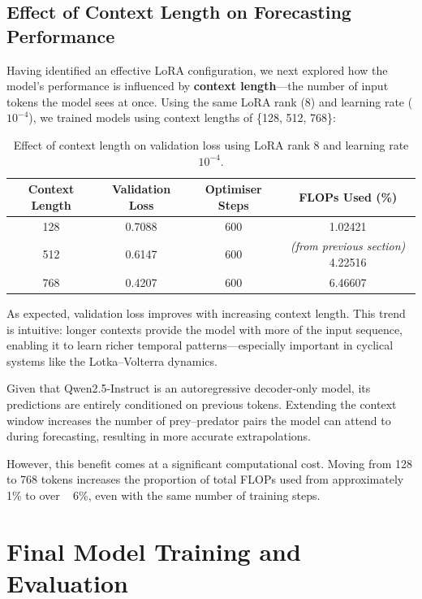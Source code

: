 \documentclass[a4paper,12pt]{article}
\begin{document}
\subsection*{Effect of Context Length on Forecasting Performance}

Having identified an effective LoRA configuration, we next explored how the model’s performance is influenced by \textbf{context length}—the number of input tokens the model sees at once. Using the same LoRA rank (8) and learning rate ($10^{-4}$), we trained models using context lengths of \{128, 512, 768\}:

\begin{table}[H]
  \centering
  \begin{tabular}{|c|c|c|c|}
    \hline
    \textbf{Context Length} & \textbf{Validation Loss} & \textbf{Optimiser Steps} & \textbf{FLOPs Used (\%)} \\
    \hline
    128 & 0.7088 & 600 & 1.02421 \\
    512 & 0.6147 & 600 & \textit{(from previous section)} 4.22516 \\
    768 & 0.4207 & 600 & 6.46607 \\
    \hline
  \end{tabular}
  \vspace{0.2cm}
  \caption{Effect of context length on validation loss using LoRA rank 8 and learning rate $10^{-4}$.}
  \label{tab:context_length_results}
\end{table}

As expected, validation loss improves with increasing context length. This trend is intuitive: longer contexts provide the model with more of the input sequence, enabling it to learn richer temporal patterns—especially important in cyclical systems like the Lotka–Volterra dynamics.

Given that Qwen2.5-Instruct is an autoregressive decoder-only model, its predictions are entirely conditioned on previous tokens. Extending the context window increases the number of prey–predator pairs the model can attend to during forecasting, resulting in more accurate extrapolations.

However, this benefit comes at a significant computational cost. Moving from 128 to 768 tokens increases the proportion of total FLOPs used from approximately 1\% to over ~ 6\%, even with the same number of training steps.


\section{Final Model Training and Evaluation}
\end{document}
